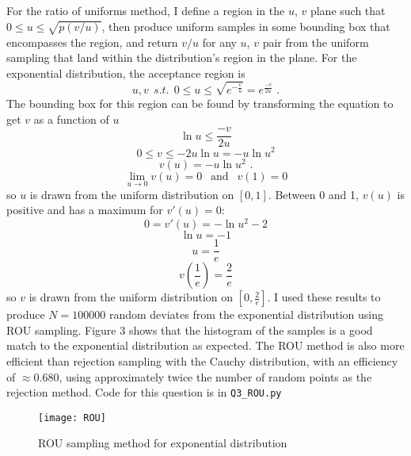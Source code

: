 \documentclass{article}
\newcommand{\<}[1]{\left\langle #1 \right\rangle }
\begin{document}
\section{}
For the ratio of uniforms method, I define a region in the $u$, $v$ plane such that $0 \leq u \leq \sqrt{p(v/u)}$, then produce uniform samples in some bounding box that encompasses the region, and return $v/u$ for any $u$, $v$ pair from the uniform sampling that land within the distribution's region in the plane. For the exponential distribution, the acceptance region is 
\[u,v \ \ s.t. \ \ 0 \leq u \leq \sqrt{e^{-\frac{v}{u}}} = e^{\frac{-v}{2u}} \text{ .}\]
The bounding box for this region can be found by transforming the equation to get $v$ as a function of $u$
\[ \ln{u} \leq \frac{-v}{2u} \]
\[0 \leq v \leq -2u\ln{u} = -u\ln{u^2}\]
\[v(u) = -u\ln{u^2} \text{ .}\]
\[\lim_{u\to 0}v(u) = 0 \ \ \text{ and } \ \ v(1) = 0\]
so $u$ is drawn from the uniform distribution on $[0,1]$. Between 0 and 1, $v(u)$ is positive and has a maximum for $v'(u) = 0$:
\[0 = v'(u) = -\ln{u^2} - 2\]
\[\ln{u} = -1\]
\[u = \frac{1}{e}\]
\[v\left(\frac{1}{e}\right) = \frac{2}{e}\]
so $v$ is drawn from the uniform distribution on $[0, \frac{2}{e}]$. I used these results to produce $N = 100000$ random deviates from the exponential distribution using ROU sampling. Figure 3 shows that the histogram of the samples is a good match to the exponential distribution as expected. The ROU method is also more efficient than rejection sampling with the Cauchy distribution, with an efficiency of $\approx 0.680$, using approximately twice the number of random points as the rejection method. Code for this question is in \texttt{Q3\_ROU.py}
\begin{figure}[h]
	\caption{ROU sampling method for exponential distribution}
	\centering
	\texttt{[image: ROU]}
\end{figure}






	
	
\end{document}
